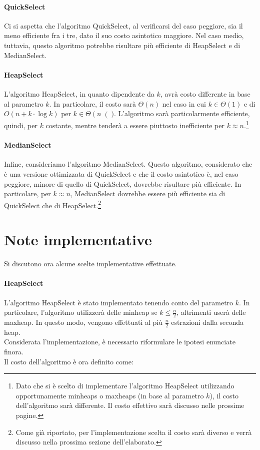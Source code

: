 \documentclass{article}
\begin{document}
	\paragraph{QuickSelect}
	Ci si aspetta che l'algoritmo QuickSelect, al verificarsi del caso peggiore, sia il meno efficiente fra i tre, dato il suo costo asintotico maggiore. Nel caso medio, tuttavia, questo algoritmo potrebbe risultare più efficiente di HeapSelect e di MedianSelect.
	
	\paragraph{HeapSelect}
	L'algoritmo HeapSelect, in quanto dipendente da $k$, avrà costo differente in base al parametro $k$.
	In particolare, il costo sarà $\Theta\left(n\right)$ nel caso in cui $k\in\Theta(1)$ e di $O\left(n + k\cdot\log{k}\right)$ per $k\in\Theta\left(n\right()$. L'algoritmo sarà particolarmente efficiente, quindi, per $k$ costante, mentre tenderà a essere piuttosto inefficiente per $k\approx n$.\footnote{Dato che si è scelto di implementare l'algoritmo HeapSelect utilizzando opportunamente minheaps o maxheaps (in base al parametro $k$), il costo dell'algoritmo sarà differente. Il costo effettivo sarà discusso nelle prossime pagine.}
	
	\paragraph{MedianSelect}
	Infine, consideriamo l'algoritmo MedianSelect. Questo algoritmo, considerato che è una versione ottimizzata di QuickSelect	e che il costo asintotico è, nel caso peggiore, minore di quello di QuickSelect, dovrebbe risultare più efficiente. In particolare, per $k\approx n$, MedianSelect dovrebbe essere più efficiente sia di QuickSelect che di HeapSelect.\footnote{Come già riportato, per l'implementazione scelta il costo sarà diverso e verrà discusso nella prossima sezione dell'elaborato.}
	
	\newpage
	
	\section{Note implementative}
	Si discutono ora alcune scelte implementative effettuate.
	
	\paragraph{HeapSelect}
	L'algoritmo HeapSelect è stato implementato tenendo conto del parametro $k$. In particolare, l'algoritmo utilizzerà delle minheap se $k\leq \frac{n}{2}$, altrimenti userà delle maxheap. In questo modo, vengono effettuati al più $\frac{n}{2}$ estrazioni dalla seconda heap. \\ Considerata l'implementazione, è necessario riformulare le ipotesi enunciate finora. \\ Il costo dell'algoritmo è ora definito come:
	
\end{document}
